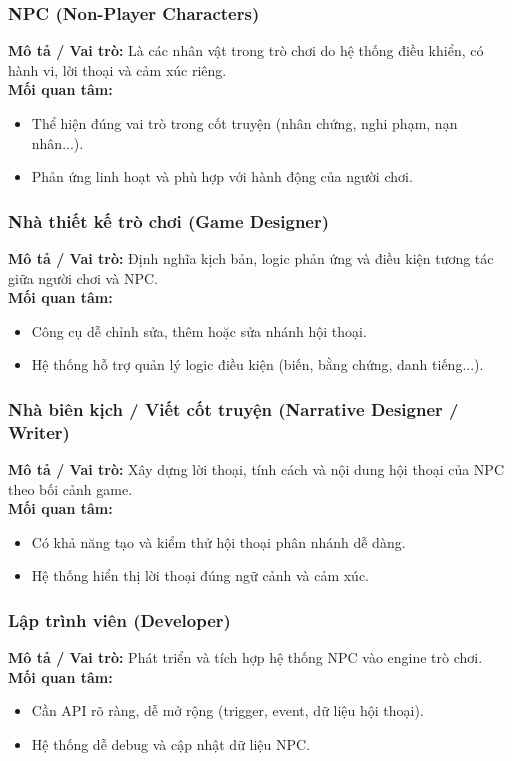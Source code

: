\subsubsection{NPC (Non-Player Characters)}
\textbf{Mô tả / Vai trò:} Là các nhân vật trong trò chơi do hệ thống điều khiển, có hành vi, lời thoại và cảm xúc riêng. \\
\textbf{Mối quan tâm:}
\begin{itemize}
    \item Thể hiện đúng vai trò trong cốt truyện (nhân chứng, nghi phạm, nạn nhân...).
    \item Phản ứng linh hoạt và phù hợp với hành động của người chơi.
\end{itemize}

\subsubsection{Nhà thiết kế trò chơi (Game Designer)}
\textbf{Mô tả / Vai trò:} Định nghĩa kịch bản, logic phản ứng và điều kiện tương tác giữa người chơi và NPC. \\
\textbf{Mối quan tâm:}
\begin{itemize}
    \item Công cụ dễ chỉnh sửa, thêm hoặc sửa nhánh hội thoại.
    \item Hệ thống hỗ trợ quản lý logic điều kiện (biến, bằng chứng, danh tiếng...).
\end{itemize}

\subsubsection{Nhà biên kịch / Viết cốt truyện (Narrative Designer / Writer)}
\textbf{Mô tả / Vai trò:} Xây dựng lời thoại, tính cách và nội dung hội thoại của NPC theo bối cảnh game. \\
\textbf{Mối quan tâm:}
\begin{itemize}
    \item Có khả năng tạo và kiểm thử hội thoại phân nhánh dễ dàng.
    \item Hệ thống hiển thị lời thoại đúng ngữ cảnh và cảm xúc.
\end{itemize}

\subsubsection{Lập trình viên (Developer)}
\textbf{Mô tả / Vai trò:} Phát triển và tích hợp hệ thống NPC vào engine trò chơi. \\
\textbf{Mối quan tâm:}
\begin{itemize}
    \item Cần API rõ ràng, dễ mở rộng (trigger, event, dữ liệu hội thoại).
    \item Hệ thống dễ debug và cập nhật dữ liệu NPC.
\end{itemize}

